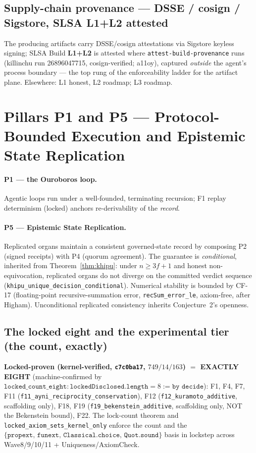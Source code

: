 \documentclass[11pt,letterpaper]{article}
\theoremstyle{definition}
\newcommand{\kernelaxioms}{\{\texttt{propext},\,\texttt{funext},\,\texttt{Classical.choice},\,\texttt{Quot.sound}\}}
\begin{document}
\subsection{Supply-chain provenance --- DSSE / cosign / Sigstore, SLSA L1+L2 attested}
The producing artifacts carry DSSE/cosign attestations via Sigstore keyless
signing; SLSA Build \textbf{L1+L2} is attested where \texttt{attest-build-provenance}
runs (killinchu run 26896047715, cosign-verified; a11oy), captured \emph{outside}
the agent's process boundary --- the top rung of the enforceability ladder for
the artifact plane. Elsewhere: L1 honest, L2 roadmap; L3 roadmap.

\section{Pillars P1 and P5 --- Protocol-Bounded Execution and Epistemic State Replication}\label{sec:p1p5}

\paragraph{P1 --- the Ouroboros loop.} Agentic loops run under a well-founded,
terminating recursion; F1 replay determinism (locked) anchors re-derivability of
the \emph{record}.

\paragraph{P5 --- Epistemic State Replication.} Replicated organs maintain a
consistent governed-state record by composing P2 (signed receipts) with P4
(quorum agreement). The guarantee is \emph{conditional}, inherited from
Theorem~\ref{thm:khipu}: under $n\ge 3f+1$ and honest non-equivocation,
replicated organs do not diverge on the committed verdict sequence
(\texttt{khipu\_unique\_decision\_conditional}). Numerical stability is bounded by
CF-17 (floating-point recursive-summation error, \texttt{recSum\_error\_le},
axiom-free, after Higham). Unconditional replicated consistency inherits
Conjecture~2's openness.

\subsection{The locked eight and the experimental tier (the count, exactly)}
\textbf{Locked-proven (kernel-verified, \texttt{c7c0ba17}, $749/14/163$) $=$
EXACTLY EIGHT} (machine-confirmed by
$\texttt{locked\_count\_eight} : \texttt{lockedDisclosed.length} = 8 := \texttt{by decide}$):
F1, F4, F7, F11 (\texttt{f11\_ayni\_reciprocity\_conservation}), F12
(\texttt{f12\_kuramoto\_additive}, scaffolding only), F18, F19
(\texttt{f19\_bekenstein\_additive}, scaffolding only, NOT the Bekenstein bound),
F22. The lock-count theorem and \texttt{locked\_axiom\_sets\_kernel\_only} enforce
the count and the $\kernelaxioms$ basis in lockstep across
Wave8/9/10/11 + Uniqueness/AxiomCheck.
\end{document}
